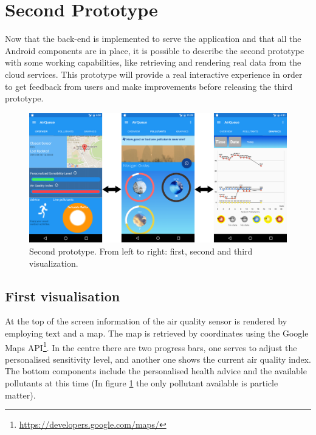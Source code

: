 \section{Second Prototype}
Now that the back-end is implemented to serve the application and that all the Android components are in place, it is possible to describe the second prototype with some working capabilities, like retrieving and rendering real data from the cloud services. This prototype will provide a real interactive experience in order to get feedback from users and make improvements before releasing the third prototype. 

\begin{figure}[H]
\begin{adjustbox}{width=1.2\textwidth,center=\textwidth}
  \centering
  \includegraphics[scale=1]{images/secondPrototype.png}
\end{adjustbox}
  \caption[Second prototype]{Second prototype. From left to right: first, second and third visualization.}
  \label{fig:first_second_prototype}
\end{figure}

\subsection{First visualisation}
At the top of the screen information of the air quality sensor is rendered by employing text and a map. The map is retrieved by coordinates using the Google Maps API\footnote{\url{https://developers.google.com/maps/}}. In the centre there are two progress bars, one serves to adjust the personalised sensitivity level, and another one shows the current air quality index. The bottom components include the personalised health advice and the available pollutants at this time (In figure \ref{fig:first_second_prototype} the only pollutant available is particle matter). 

